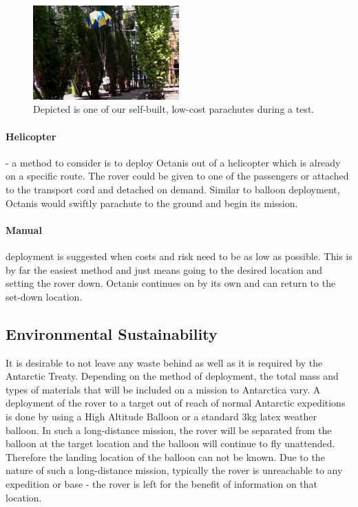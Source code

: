 \documentclass[a4paper,12pt]{article}
\begin{document}
\begin{figure}[h!]
	\centering
    \includegraphics[width=0.5\textwidth]{lowcostchute}
    \caption{Depicted is one of our self-built, low-cost parachutes during a test. }
\end{figure}


\paragraph{Helicopter} - a method to consider is to deploy Octanis out of a helicopter which is already on a specific route. The rover could be given to one of the passengers or attached to the transport cord and detached on demand. Similar to balloon deployment, Octanis would swiftly parachute to the ground and begin its mission.


\paragraph{Manual} deployment is suggested when costs and risk need to be as low as possible. This is by far the easiest method and just means going to the desired location and setting the rover down. Octanis continues on by its own and can return to the set-down location.




\subsection{Environmental Sustainability}
It is desirable to not leave any waste behind as well as it is required by the Antarctic Treaty. Depending on the method of deployment, the total mass and types of materials that will be included on a mission to Antarctica vary. A deployment of the rover to a target out of reach of normal Antarctic expeditions is done by using a High Altitude Balloon or a standard 3kg latex weather balloon. In such a long-distance mission, the rover will be separated from the balloon at the target location and the balloon will continue to fly unattended. Therefore the landing location of the balloon can not be known. Due to the nature of such a long-distance mission, typically the rover is unreachable to any expedition or base - the rover is left for the benefit of information on that location.
\end{document}
